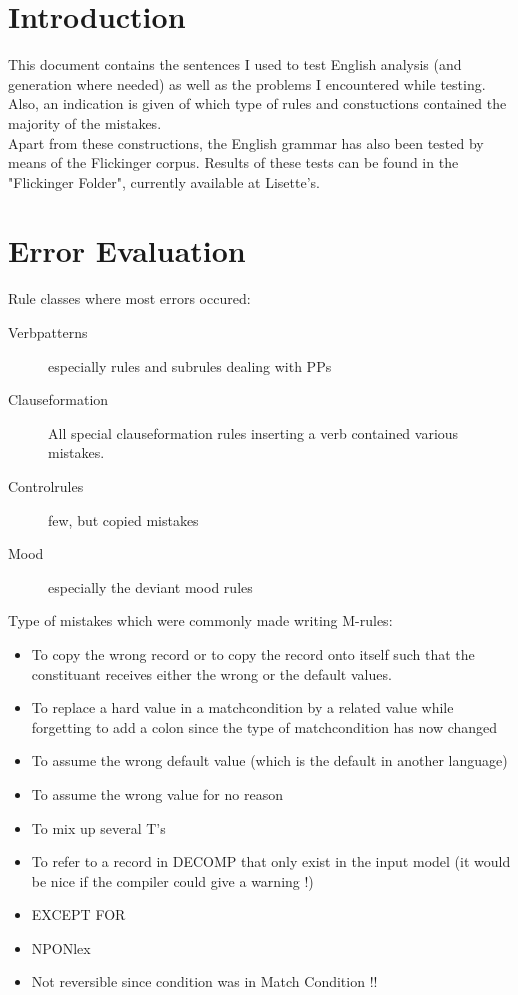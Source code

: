 

   \RosDate{\today}
   \RosSupersedes{-}
   \RosKeywords{}
   \MakeRosTitle
%
%

\section {Introduction}
This document contains the sentences I used to test English analysis 
(and generation where needed) as well as the problems I encountered while 
testing. Also, an indication is given of which type of rules and constuctions 
contained the majority of the mistakes.\\

Apart from these constructions, the English grammar has also been tested by 
means of the Flickinger corpus. Results of these tests can be found in the 
"Flickinger Folder", currently available at Lisette's.\\

\section {Error Evaluation}
Rule classes where most errors occured:
\begin{description}
\item [Verbpatterns] especially rules and subrules dealing with PPs
\item [Clauseformation] All special clauseformation rules inserting a verb 
contained various mistakes.
\item [Controlrules] few, but copied mistakes
\item [Mood] especially the deviant mood rules
\end{description}
Type of mistakes which were commonly made writing M-rules:
\begin{itemize}
\item To copy the wrong record or to copy the record onto itself such that 
the constituant receives either the wrong or the default values.
\item To replace a hard value in a matchcondition by a related value while 
forgetting to add a colon since the type of matchcondition has now changed 
\item To assume the wrong default value (which is the default in another 
language)
\item To assume the wrong value for no reason
\item To mix up several T's 
\item To refer to a record in DECOMP that only exist in the input model (it 
would be nice if the compiler could give a warning !) 
\item EXCEPT FOR
\item NPONlex
\item Not reversible since condition was in Match Condition !!
\end{itemize}
